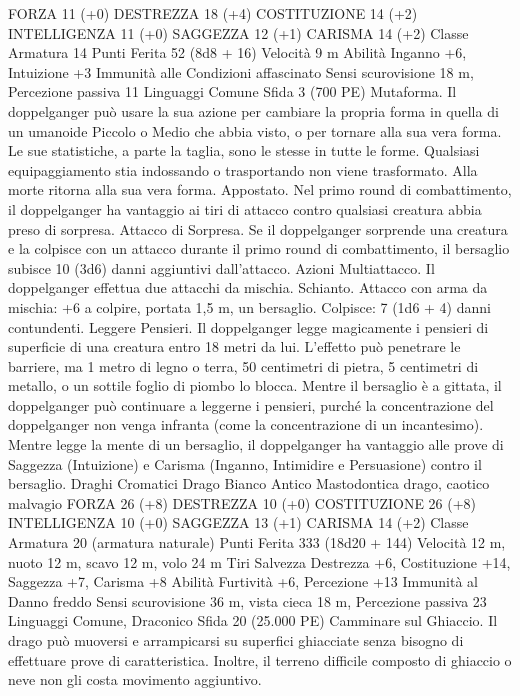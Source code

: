 \begin{multicols}{2}
FORZA 11 (+0)
DESTREZZA 18 (+4)
COSTITUZIONE 14 (+2)
INTELLIGENZA 11 (+0)
SAGGEZZA 12 (+1)
CARISMA 14 (+2)
Classe Armatura 14
Punti Ferita 52 (8d8 + 16)
Velocità 9 m
Abilità Inganno +6, Intuizione +3
Immunità alle Condizioni affascinato
Sensi scurovisione 18 m, Percezione passiva 11
Linguaggi Comune
Sfida 3 (700 PE)
Mutaforma. Il doppelganger può usare la sua azione per
cambiare la propria forma in quella di un umanoide Piccolo o
Medio che abbia visto, o per tornare alla sua vera forma. Le sue
statistiche, a parte la taglia, sono le stesse in tutte le forme.
Qualsiasi equipaggiamento stia indossando o trasportando non
viene trasformato. Alla morte ritorna alla sua vera forma.
Appostato. Nel primo round di combattimento, il doppelganger
ha vantaggio ai tiri di attacco contro qualsiasi creatura abbia
preso di sorpresa.
Attacco di Sorpresa. Se il doppelganger sorprende una creatura e
la colpisce con un attacco durante il primo round di
combattimento, il bersaglio subisce 10 (3d6) danni aggiuntivi
dall’attacco.
Azioni
Multiattacco. Il doppelganger effettua due attacchi da mischia.
Schianto. Attacco con arma da mischia: +6 a colpire, portata 1,5
m, un bersaglio.
Colpisce: 7 (1d6 + 4) danni contundenti.
Leggere Pensieri. Il doppelganger legge magicamente i pensieri
di superficie di una creatura entro 18 metri da lui. L’effetto può
penetrare le barriere, ma 1 metro di legno o terra, 50 centimetri
di pietra, 5 centimetri di metallo, o un sottile foglio di piombo lo
blocca. Mentre il bersaglio è a gittata, il doppelganger può
continuare a leggerne i pensieri, purché la concentrazione del
doppelganger non venga infranta (come la concentrazione di un
incantesimo). Mentre legge la mente di un bersaglio, il
doppelganger ha vantaggio alle prove di Saggezza (Intuizione) e
Carisma (Inganno, Intimidire e Persuasione) contro il bersaglio.
Draghi Cromatici
Drago Bianco Antico
Mastodontica drago, caotico malvagio
FORZA 26 (+8)
DESTREZZA 10 (+0)
COSTITUZIONE 26 (+8)
INTELLIGENZA 10 (+0)
SAGGEZZA 13 (+1)
CARISMA 14 (+2)
Classe Armatura 20 (armatura naturale)
Punti Ferita 333 (18d20 + 144)
Velocità 12 m, nuoto 12 m, scavo 12 m, volo 24 m
Tiri Salvezza Destrezza +6, Costituzione +14, Saggezza +7,
Carisma +8
Abilità Furtività +6, Percezione +13
Immunità al Danno freddo
Sensi scurovisione 36 m, vista cieca 18 m, Percezione passiva 23
Linguaggi Comune, Draconico
Sfida 20 (25.000 PE)
Camminare sul Ghiaccio. Il drago può muoversi e arrampicarsi su
superfici ghiacciate senza bisogno di effettuare prove di
caratteristica. Inoltre, il terreno difficile composto di ghiaccio o neve
non gli costa movimento aggiuntivo.

\end{multicols}
